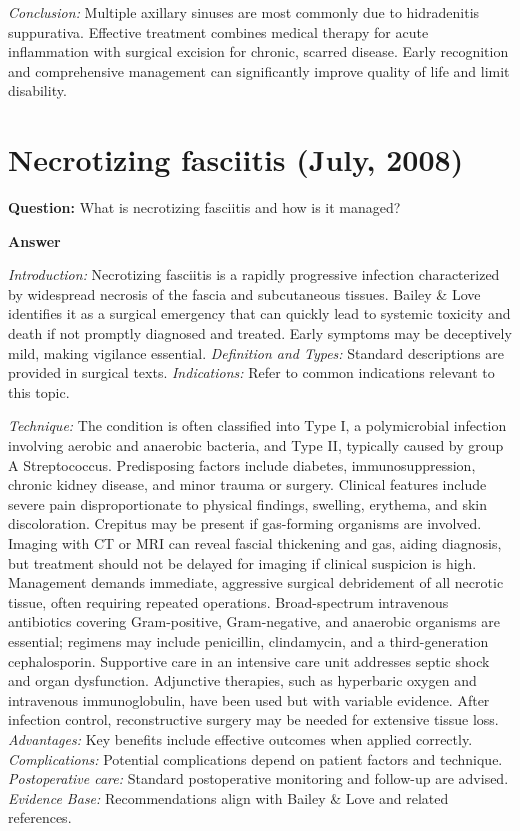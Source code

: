 \documentclass{article}
\begin{document}
\emph{Conclusion:} Multiple axillary sinuses are most commonly due to hidradenitis suppurativa. Effective treatment combines medical therapy for acute inflammation with surgical excision for chronic, scarred disease. Early recognition and comprehensive management can significantly improve quality of life and limit disability.


\section{Necrotizing fasciitis (July, 2008)}

\textbf{Question:} What is necrotizing fasciitis and how is it managed?

\textbf{Answer}

\emph{Introduction:} Necrotizing fasciitis is a rapidly progressive infection characterized by widespread necrosis of the fascia and subcutaneous tissues. Bailey & Love identifies it as a surgical emergency that can quickly lead to systemic toxicity and death if not promptly diagnosed and treated. Early symptoms may be deceptively mild, making vigilance essential.
\emph{Definition and Types:} Standard descriptions are provided in surgical texts.
\emph{Indications:} Refer to common indications relevant to this topic.

\emph{Technique:} The condition is often classified into Type I, a polymicrobial infection involving aerobic and anaerobic bacteria, and Type II, typically caused by group A Streptococcus. Predisposing factors include diabetes, immunosuppression, chronic kidney disease, and minor trauma or surgery. Clinical features include severe pain disproportionate to physical findings, swelling, erythema, and skin discoloration. Crepitus may be present if gas-forming organisms are involved. Imaging with CT or MRI can reveal fascial thickening and gas, aiding diagnosis, but treatment should not be delayed for imaging if clinical suspicion is high. Management demands immediate, aggressive surgical debridement of all necrotic tissue, often requiring repeated operations. Broad-spectrum intravenous antibiotics covering Gram-positive, Gram-negative, and anaerobic organisms are essential; regimens may include penicillin, clindamycin, and a third-generation cephalosporin. Supportive care in an intensive care unit addresses septic shock and organ dysfunction. Adjunctive therapies, such as hyperbaric oxygen and intravenous immunoglobulin, have been used but with variable evidence. After infection control, reconstructive surgery may be needed for extensive tissue loss.
\emph{Advantages:} Key benefits include effective outcomes when applied correctly.
\emph{Complications:} Potential complications depend on patient factors and technique.
\emph{Postoperative care:} Standard postoperative monitoring and follow-up are advised.
\emph{Evidence Base:} Recommendations align with Bailey & Love and related references.
\end{document}
